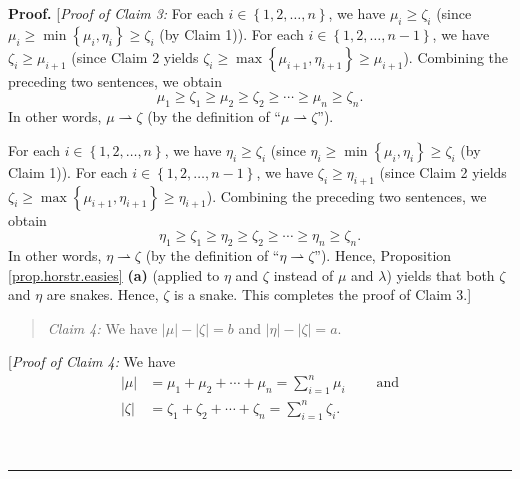 \documentclass[numbers=enddot,12pt,final,onecolumn,notitlepage]{scrartcl}%
\theoremstyle{definition}
\newenvironment{statement}{\begin{quote}}{\end{quote}}
\newenvironment{proof}[1][Proof]{\noindent\textbf{#1.} }{\ \rule{0.5em}{0.5em}}
\let\sumnonlimits\sum
\renewcommand{\sum}{\sumnonlimits\limits}
\begin{document}
\begin{proof}
[\textit{Proof of Claim 3:} For each $i\in\left\{  1,2,\ldots,n\right\}  $, we
have $\mu_{i}\geq\zeta_{i}$ (since $\mu_{i}\geq\min\left\{  \mu_{i},\eta
_{i}\right\}  \geq\zeta_{i}$ (by Claim 1)). For each $i\in\left\{
1,2,\ldots,n-1\right\}  $, we have $\zeta_{i}\geq\mu_{i+1}$ (since Claim 2
yields $\zeta_{i}\geq\max\left\{  \mu_{i+1},\eta_{i+1}\right\}  \geq\mu_{i+1}%
$). Combining the preceding two sentences, we obtain%
\[
\mu_{1}\geq\zeta_{1}\geq\mu_{2}\geq\zeta_{2}\geq\cdots\geq\mu_{n}\geq\zeta
_{n}.
\]
In other words, $\mu\rightharpoonup\zeta$ (by the definition of
\textquotedblleft$\mu\rightharpoonup\zeta$\textquotedblright).

For each $i\in\left\{  1,2,\ldots,n\right\}  $, we have $\eta_{i}\geq\zeta
_{i}$ (since $\eta_{i}\geq\min\left\{  \mu_{i},\eta_{i}\right\}  \geq\zeta
_{i}$ (by Claim 1)). For each $i\in\left\{  1,2,\ldots,n-1\right\}  $, we have
$\zeta_{i}\geq\eta_{i+1}$ (since Claim 2 yields $\zeta_{i}\geq\max\left\{
\mu_{i+1},\eta_{i+1}\right\}  \geq\eta_{i+1}$). Combining the preceding two
sentences, we obtain%
\[
\eta_{1}\geq\zeta_{1}\geq\eta_{2}\geq\zeta_{2}\geq\cdots\geq\eta_{n}\geq
\zeta_{n}.
\]
In other words, $\eta\rightharpoonup\zeta$ (by the definition of
\textquotedblleft$\eta\rightharpoonup\zeta$\textquotedblright). Hence,
Proposition \ref{prop.horstr.easies} \textbf{(a)} (applied to $\eta$ and
$\zeta$ instead of $\mu$ and $\lambda$) yields that both $\zeta$ and $\eta$
are snakes. Hence, $\zeta$ is a snake. This completes the proof of Claim 3.]

\begin{statement}
\textit{Claim 4:} We have $\left\vert \mu\right\vert -\left\vert
\zeta\right\vert =b$ and $\left\vert \eta\right\vert -\left\vert
\zeta\right\vert =a$.
\end{statement}

[\textit{Proof of Claim 4:} We have%
\begin{align*}
\left\vert \mu\right\vert  &  =\mu_{1}+\mu_{2}+\cdots+\mu_{n}=\sum_{i=1}%
^{n}\mu_{i}\ \ \ \ \ \ \ \ \ \ \text{and}\\
\left\vert \zeta\right\vert  &  =\zeta_{1}+\zeta_{2}+\cdots+\zeta_{n}%
=\sum_{i=1}^{n}\zeta_{i}.
\end{align*}



\end{proof}
\end{document}

